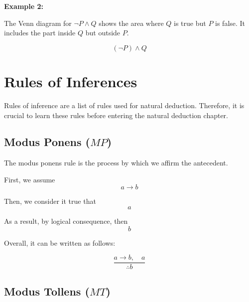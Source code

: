\documentclass[12pt,a4paper,openany]{article}
\begin{document}
\textbf{Example 2:} 

The Venn diagram for \(\neg P \wedge Q\) shows the area where \(Q\) is true but \(P\) is false. It includes the part inside \(Q\) but outside \(P\).

\[
(\neg P) \wedge Q
\]

\begin{center}
\end{center}




\section{Rules of Inferences}

Rules of inference are a list of rules used for natural deduction. Therefore, it is crucial to learn these rules before entering the natural deduction chapter.

\subsection{Modus Ponens (\(MP\))}\label{modus-ponens-mp}

The modus ponens rule is the process by which we affirm the antecedent.

First, we assume \[a \rightarrow b\]

Then, we consider it true that \[a\]

As a result, by logical consequence, then \[b\]

Overall, it can be written as follows:

\[\frac{a \rightarrow b, \quad a}{\therefore b}\]

\subsection{Modus Tollens (\(MT\))}\label{modus-tollens-mt}
\end{document}
